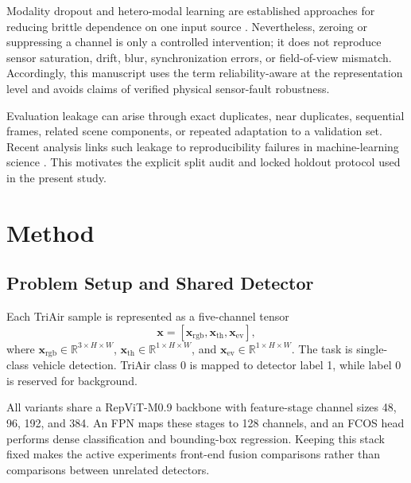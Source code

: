 Modality dropout and hetero-modal learning are established approaches for reducing brittle dependence on one input source \cite{ModDrop2016,HeMIS2016}. Nevertheless, zeroing or suppressing a channel is only a controlled intervention; it does not reproduce sensor saturation, drift, blur, synchronization errors, or field-of-view mismatch. Accordingly, this manuscript uses the term reliability-aware at the representation level and avoids claims of verified physical sensor-fault robustness.

Evaluation leakage can arise through exact duplicates, near duplicates, sequential frames, related scene components, or repeated adaptation to a validation set. Recent analysis links such leakage to reproducibility failures in machine-learning science \cite{Kapoor2023Patterns}. This motivates the explicit split audit and locked holdout protocol used in the present study.

\section{Method}

\subsection{Problem Setup and Shared Detector}

Each TriAir sample is represented as a five-channel tensor
\begin{equation}
\mathbf{x}=[\mathbf{x}_{\mathrm{rgb}},\mathbf{x}_{\mathrm{th}},\mathbf{x}_{\mathrm{ev}}],
\end{equation}
where $\mathbf{x}_{\mathrm{rgb}}\in\mathbb{R}^{3\times H\times W}$, $\mathbf{x}_{\mathrm{th}}\in\mathbb{R}^{1\times H\times W}$, and $\mathbf{x}_{\mathrm{ev}}\in\mathbb{R}^{1\times H\times W}$. The task is single-class vehicle detection. TriAir class 0 is mapped to detector label 1, while label 0 is reserved for background.

All variants share a RepViT-M0.9 backbone with feature-stage channel sizes 48, 96, 192, and 384. An FPN maps these stages to 128 channels, and an FCOS head performs dense classification and bounding-box regression. Keeping this stack fixed makes the active experiments front-end fusion comparisons rather than comparisons between unrelated detectors.

